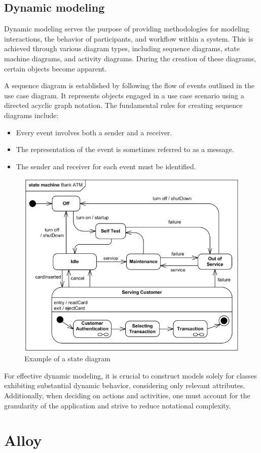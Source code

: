\documentclass[12pt, a4paper]{report}
\begin{document}
    \section{Dynamic modeling}
    Dynamic modeling serves the purpose of providing methodologies for modeling interactions, the behavior of participants, and workflow within a system. 
    This is achieved through various diagram types, including sequence diagrams, state machine diagrams, and activity diagrams. 
    During the creation of these diagrams, certain objects become apparent.
     
    A sequence diagram is established by following the flow of events outlined in the use case diagram. 
    It represents objects engaged in a use case scenario using a directed acyclic graph notation. 
    The fundamental rules for creating sequence diagrams include:
    \begin{itemize}
        \item Every event involves both a sender and a receiver.
        \item The representation of the event is sometimes referred to as a message.
        \item The sender and receiver for each event must be identified.
    \end{itemize}
    \begin{figure}[H]
        \centering
        \includegraphics[width=0.5\linewidth]{images/state.png}
        \caption{Example of a state diagram}
    \end{figure}
    For effective dynamic modeling, it is crucial to construct models solely for classes exhibiting substantial dynamic behavior, considering only relevant attributes. 
    Additionally, when deciding on actions and activities, one must account for the granularity of the application and strive to reduce notational complexity.

\newpage

\chapter{Alloy}
\end{document}
